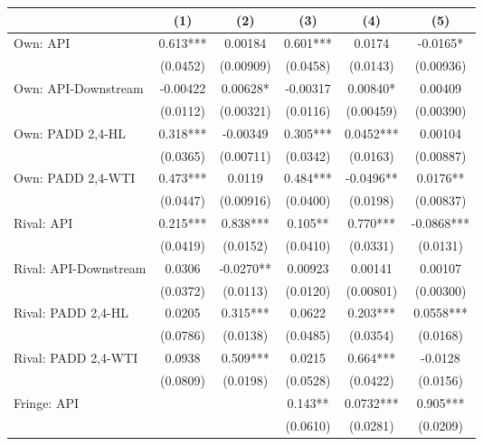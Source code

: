 {
\def\sym#1{\ifmmode^{#1}\else\(^{#1}\)\fi}
\begin{tabular}{l*{5}{c}}
\toprule
                &\multicolumn{1}{c}{(1)}   &\multicolumn{1}{c}{(2)}   &\multicolumn{1}{c}{(3)}   &\multicolumn{1}{c}{(4)}   &\multicolumn{1}{c}{(5)}   \\
\midrule
Own: API        &    0.613***&  0.00184   &    0.601***&   0.0174   &  -0.0165*  \\
                & (0.0452)   &(0.00909)   & (0.0458)   & (0.0143)   &(0.00936)   \\
\addlinespace
Own: API-Downstream& -0.00422   &  0.00628*  & -0.00317   &  0.00840*  &  0.00409   \\
                & (0.0112)   &(0.00321)   & (0.0116)   &(0.00459)   &(0.00390)   \\
\addlinespace
Own: PADD 2,4-HL&    0.318***& -0.00349   &    0.305***&   0.0452***&  0.00104   \\
                & (0.0365)   &(0.00711)   & (0.0342)   & (0.0163)   &(0.00887)   \\
\addlinespace
Own: PADD 2,4-WTI&    0.473***&   0.0119   &    0.484***&  -0.0496** &   0.0176** \\
                & (0.0447)   &(0.00916)   & (0.0400)   & (0.0198)   &(0.00837)   \\
\addlinespace
Rival: API      &    0.215***&    0.838***&    0.105** &    0.770***&  -0.0868***\\
                & (0.0419)   & (0.0152)   & (0.0410)   & (0.0331)   & (0.0131)   \\
\addlinespace
Rival: API-Downstream&   0.0306   &  -0.0270** &  0.00923   &  0.00141   &  0.00107   \\
                & (0.0372)   & (0.0113)   & (0.0120)   &(0.00801)   &(0.00300)   \\
\addlinespace
Rival: PADD 2,4-HL&   0.0205   &    0.315***&   0.0622   &    0.203***&   0.0558***\\
                & (0.0786)   & (0.0138)   & (0.0485)   & (0.0354)   & (0.0168)   \\
\addlinespace
Rival: PADD 2,4-WTI&   0.0938   &    0.509***&   0.0215   &    0.664***&  -0.0128   \\
                & (0.0809)   & (0.0198)   & (0.0528)   & (0.0422)   & (0.0156)   \\
\addlinespace
Fringe: API     &            &            &    0.143** &   0.0732***&    0.905***\\
                &            &            & (0.0610)   & (0.0281)   & (0.0209)   \\

\end{tabular}}
